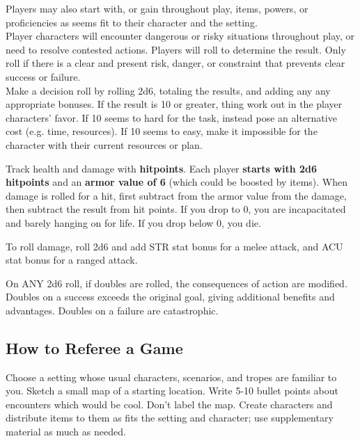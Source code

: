 \documentclass[a4,landscape]{book}
\begin{document}
\begin{multicols*}{4}
Players may also start with, or gain throughout play, items, powers, or proficiencies as seems fit to their character and the setting. \\

Player characters will encounter dangerous or risky situations throughout play, or need to resolve contested actions.
Players will roll to determine the result.
Only roll if there is a clear and present risk, danger, or constraint that prevents clear success or failure. \\

Make a decision roll by rolling 2d6, totaling the results, and adding any any appropriate bonuses.
If the result is 10 or greater, thing work out in the player characters' favor.
If 10 seems to hard for the task, instead pose an alternative cost (e.g. time, resources).
If 10 seems to easy, make it impossible for the character with their current resources or plan.\\

Track health and damage with \textbf{hitpoints}.
Each player \textbf{starts with 2d6 hitpoints} and an \textbf{armor value of 6} (which could be boosted by items).
When damage is rolled for a hit, first subtract from the armor value from the damage, then subtract the result from hit points.
If you drop to 0, you are incapacitated and barely hanging on for life.
If you drop below 0, you die.

To roll damage, roll 2d6 and add STR stat bonus for a melee attack, and ACU stat bonus for a ranged attack.

On ANY 2d6 roll, if doubles are rolled, the consequences of action are modified.
Doubles on a success exceeds the original goal, giving additional benefits and advantages.
Doubles on a failure are catastrophic. 

\subsection*{How to Referee a Game}

Choose a setting whose usual characters, scenarios, and tropes are familiar to you.
Sketch a small map of a starting location.
Write 5-10 bullet points about encounters which would be cool.
Don't label the map.
Create characters and distribute items to them as fits the setting and character; use supplementary material as much as needed. \\


\end{multicols*}
\end{document}

